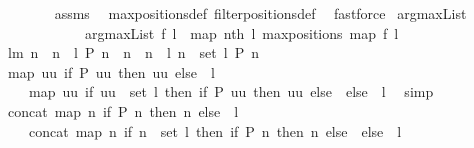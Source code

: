 \begin{isabellebody}
%
\isadelimproof
\ \ \ \ \ \ %
\endisadelimproof
%
\isatagproof
{}\isamarkupfalse%
\ assms\ \isamarkupfalse%
\ maxpositions{\isacharunderscore}def\ filterpositions{}{\isacharunderscore}def\ \isamarkupfalse%
\ fastforce%
\endisatagproof
{\isafoldproof}%
%
\isadelimproof
\isanewline
%
\endisadelimproof
\isanewline
\isanewline
{}\isamarkupfalse%
\ argmaxList\ \isanewline
\ \ \ \ \ \ \ \ \ \ \ \ {\isachardoublequoteopen}argmaxList\ f\ l\ {\isacharequal}\ map\ {\isacharparenleft}nth\ l{\isacharparenright}\ {\isacharparenleft}maxpositions\ {\isacharparenleft}map\ f\ l{\isacharparenright}{\isacharparenright}{\isachardoublequoteclose}\isanewline
\isanewline
\isanewline
{}\isamarkupfalse%
\ lm{}{}{\isacharcolon}\ {\isachardoublequoteopen}{\isacharbrackleft}n\ {\isachardot}\ n\ {\isacharless}{\isacharminus}\ l{\isacharcomma}\ P\ n{\isacharbrackright}\ {\isacharequal}\ {\isacharbrackleft}n\ {\isachardot}\ n\ {\isacharless}{\isacharminus}\ l{\isacharcomma}\ n\ {\isasymin}\ set\ l{\isacharcomma}\ P\ n{\isacharbrackright}{\isachardoublequoteclose}\ \isanewline
%
\isadelimproof
%
\endisadelimproof
%
\isatagproof
{}\isamarkupfalse%
\ {\isacharminus}\ \isanewline
\ \isanewline
\ \ \isamarkupfalse%
\ {\isachardoublequoteopen}map\ {\isacharparenleft}{\isasymlambda}uu{\isachardot}\ if\ P\ uu\ then\ {\isacharbrackleft}uu{\isacharbrackright}\ else\ {\isacharbrackleft}{\isacharbrackright}{\isacharparenright}\ l\ {\isacharequal}\ \isanewline
\ \ \ \ map\ {\isacharparenleft}{\isasymlambda}uu{\isachardot}\ if\ uu\ {\isasymin}\ set\ l\ then\ if\ P\ uu\ then\ {\isacharbrackleft}uu{\isacharbrackright}\ else\ {\isacharbrackleft}{\isacharbrackright}\ else\ {\isacharbrackleft}{\isacharbrackright}{\isacharparenright}\ l{\isachardoublequoteclose}\ \isamarkupfalse%
\ simp\isanewline
\ \ \isamarkupfalse%
\ {\isachardoublequoteopen}concat\ {\isacharparenleft}map\ {\isacharparenleft}{\isasymlambda}n{\isachardot}\ if\ P\ n\ then\ {\isacharbrackleft}n{\isacharbrackright}\ else\ {\isacharbrackleft}{\isacharbrackright}{\isacharparenright}\ l{\isacharparenright}\ {\isacharequal}\ \isanewline
\ \ \ \ concat\ {\isacharparenleft}map\ {\isacharparenleft}{\isasymlambda}n{\isachardot}\ if\ n\ {\isasymin}\ set\ l\ then\ if\ P\ n\ then\ {\isacharbrackleft}n{\isacharbrackright}\ else\ {\isacharbrackleft}{\isacharbrackright}\ else\ {\isacharbrackleft}{\isacharbrackright}{\isacharparenright}\ l{\isacharparenright}{\isachardoublequoteclose}\ \isamarkupfalse%

\end{isabellebody}
